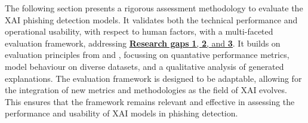 
The following section presents a rigorous assessment methodology to evaluate the XAI phishing detection models. It validates both the technical performance and operational usability, with respect to human factors, with a multi-faceted evaluation framework, addressing \uline{\textbf{Research gaps} \hyperref[research-gap-1]{\uline{\textbf{1}}}, \hyperref[research-gap-2]{\textbf{2}}, and \hyperref[research-gap-3]{\textbf{3}}}. It builds on evaluation principles from \cite{reddy2023explainable} and \cite{van2024applicability}, focussing on quantative performance metrics, model behaviour on diverse datasets, and a qualitative analysis of generated explanations. The evaluation framework is designed to be adaptable, allowing for the integration of new metrics and methodologies as the field of XAI evolves. This ensures that the framework remains relevant and effective in assessing the performance and usability of XAI models in phishing detection.

